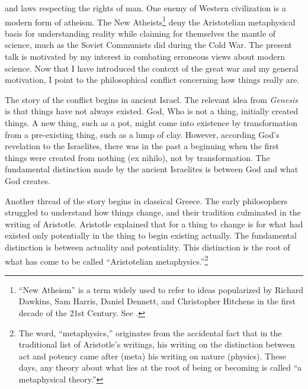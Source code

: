 \documentclass[twocolumn]{article}
\begin{document}
and laws respecting the rights of man.  One enemy of Western civilization is a
modern form of atheism.  The New Atheists\footnote{%
   ``New Atheism'' is a term widely used to refer to ideas popularized by
   Richard Dawkins, Sam Harris, Daniel Dennett, and Christopher Hitchens in the
   first decade of the 21st Century.  See \cite{f2008}.
}
deny the Aristotelian metaphysical basis for understanding reality while
claiming for themselves the mantle of science, much as the Soviet Communists
did during the Cold War.  The present talk is motivated by my interest in
combating erroneous views about modern science.  Now that I have introduced the
context of the great war and my general motivation, I point to the
philosophical conflict concerning how things really are.

The story of the conflict begins in ancient Israel.  The relevant idea from
{\it Genesis} is that things have not always existed.  God, Who is not a thing,
initially created things.  A new thing, such as a pot, might come into
existence by transformation from a pre-existing thing, such as a lump of clay.
However, according God's revelation to the Israelites, there was in the past a
beginning when the first things were created from nothing (ex nihilo), not by
transformation.  The fundamental distinction made by the ancient Israelites is
between God and what God creates.

Another thread of the story begins in classical Greece.  The early philosophers
struggled to understand how things change, and their tradition culminated in
the writing of Aristotle.  Aristotle explained that for a thing to change is
for what had existed only potentially in the thing to begin existing actually.
The fundamental distinction is between actuality and potentiality.  This
distinction is the root of what has come to be called ``Aristotelian
metaphysics.''\footnote{%
   The word, ``metaphysics,'' originates from the accidental fact that in the
   traditional list of Aristotle's writings, his writing on the distinction
   between act and potency came after (meta) his writing on nature (physics).
   These days, any theory about what lies at the root of being or becoming is
   called ``a metaphysical theory.''%
}
\end{document}
